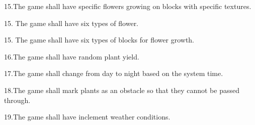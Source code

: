 \label{Requirements_R16}%
%
15.\+The game shall have specific flowers growing on blocks with specific textures.

\label{Requirements_R17}%
%
15. The game shall have six types of flower.

\label{Requirements_R18}%
%
15. The game shall have six types of blocks for flower growth.

\label{Requirements_R19}%
%
16.\+The game shall have random plant yield.

\label{Requirements_R20}%
%
17.\+The game shall change from day to night based on the system time.

\label{Requirements_R21}%
%
18.\+The game shall mark plants as an obstacle so that they cannot be passed through.

\label{Requirements_R22}%
%
19.\+The game shall have inclement weather conditions. 